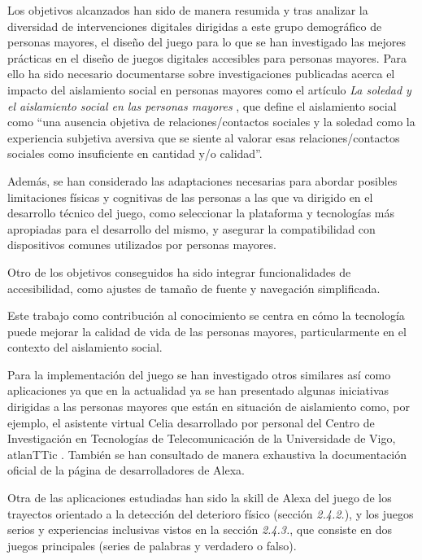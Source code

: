 Los objetivos alcanzados han sido de manera resumida y tras analizar la diversidad de intervenciones digitales dirigidas a este grupo demográfico de personas mayores, el diseño del juego para lo que se han investigado las mejores prácticas en el diseño de juegos digitales accesibles para personas mayores. Para ello ha sido necesario documentarse sobre investigaciones publicadas acerca el impacto del aislamiento social en personas mayores como el artículo \textit{La soledad y el aislamiento social en las personas mayores} \parencite{ArruebarrenaCabaco2020}, que define el aislamiento social como \enquote{una ausencia objetiva de relaciones/contactos sociales y la soledad como la experiencia subjetiva aversiva que se siente al valorar esas relaciones/contactos sociales como insuficiente en cantidad y/o calidad}.

Además, se han considerado las adaptaciones necesarias para abordar posibles limitaciones físicas y cognitivas de las personas a las que va dirigido en el desarrollo técnico del juego, como seleccionar la plataforma y tecnologías más apropiadas para el desarrollo del mismo, y asegurar la compatibilidad con dispositivos comunes utilizados por personas mayores.

Otro de los objetivos conseguidos ha sido integrar funcionalidades de accesibilidad, como ajustes de tamaño de fuente y navegación simplificada.

Este trabajo como contribución al conocimiento se centra en cómo la tecnología puede mejorar la calidad de vida de las personas mayores, particularmente en el contexto del aislamiento social.

Para la implementación del juego se han investigado otros similares así como aplicaciones ya que en la actualidad ya se han presentado algunas iniciativas dirigidas a las personas mayores que están en situación de aislamiento como, por ejemplo, el asistente virtual Celia desarrollado por personal del Centro de Investigación en Tecnologías de Telecomunicación de la Universidade de Vigo, atlanTTic \parencite{celia-app}. También se han consultado de manera exhaustiva la documentación oficial de la página de desarrolladores de Alexa.

Otra de las aplicaciones estudiadas han sido la skill de Alexa del juego de los trayectos orientado a la detección del deterioro físico (sección \textit{2.4.2.}), y los juegos serios y experiencias inclusivas vistos en la sección \textit{2.4.3.}, que consiste en dos juegos principales (series de palabras y verdadero o falso).

